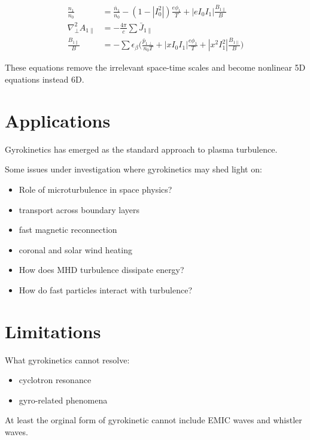 \documentclass[
  notoc %
]{tufte-book}
\providecommand{\tightlist}{%
  \setlength{\itemsep}{0pt}\setlength{\parskip}{0pt}
}
\begin{document}
\[
\begin{aligned}
\frac{n_1}{n_0} &= \frac{\bar{n}_1}{n_0} - (1- |I_0^2|)\frac{e\phi_1}{T} + |eI_0I_1|\frac{B_{1\parallel}}{B} \\
\nabla_\perp^2 A_{1\parallel} &= -\frac{4\pi}{c}\sum\bar{J}_{1\parallel} \\
\frac{B_{1\parallel}}{B} &= -\sum \epsilon_\beta\Big( \frac{\bar{p}_{1\perp}}{n_0 T} + |xI_0I_1|\frac{e\phi_1}{T} + |x^2I_1^2|\frac{B_{1\parallel}}{B} \Big)
\end{aligned}
\]

These equations remove the irrelevant space-time scales and become
nonlinear 5D equations instead 6D.

\hypertarget{applications}{%
\section{Applications}\label{applications}}

Gyrokinetics has emerged as the standard approach to plasma turbulence.

Some issues under investigation where gyrokinetics may shed light on:

\begin{itemize}
\tightlist
\item
  Role of microturbulence in space physics?
\item
  transport across boundary layers
\item
  fast magnetic reconnection
\item
  coronal and solar wind heating
\item
  How does MHD turbulence dissipate energy?
\item
  How do fast particles interact with turbulence?
\end{itemize}

\hypertarget{limitations}{%
\section{Limitations}\label{limitations}}

What gyrokinetics cannot resolve:

\begin{itemize}
\tightlist
\item
  cyclotron resonance
\item
  gyro-related phenomena
\end{itemize}

At least the orginal form of gyrokinetic cannot include EMIC waves and
whistler waves.
\end{document}
